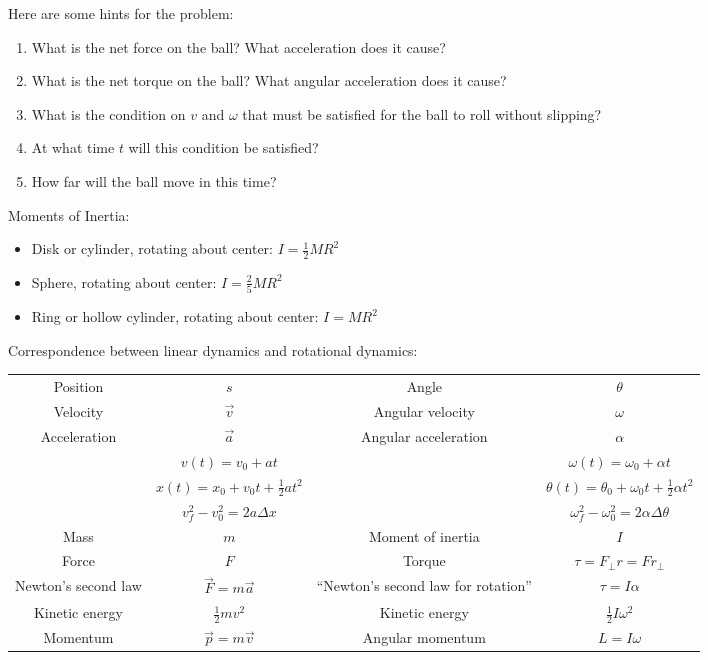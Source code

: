 \documentclass[12pt]{article}
\begin{document}
\begin{enumerate}
{     Here are some hints for the problem:
     \begin{enumerate}
       \item{What is the net force on the ball? What acceleration does it cause?}
       \item{What is the net torque on the ball? What angular acceleration does it cause?}
       \item{What is the condition on $v$ and $\omega$ that must be satisfied for the ball to roll without slipping?}
       \item{At what time $t$ will this condition be satisfied?}
       \item{How far will the ball move in this time?}
     \end{enumerate}

   }

\newpage

\centerline{}


Moments of Inertia:
\begin{itemize}
  \item{Disk or cylinder, rotating about center: $I = \frac{1}{2}MR^2$}
  \item{Sphere, rotating about center: $I = \frac{2}{5}MR^2$}
  \item{Ring or hollow cylinder, rotating about center: $I = MR^2$}
\end{itemize}

\bigskip
\bigskip
\bigskip

Correspondence between linear dynamics and rotational dynamics: 
  \scriptsize

\begin{tabular}{| c | c | c | c |}
  \hline
  Position & $s$ & Angle & $\theta$  \\
  Velocity & $\vec v$ & Angular velocity & $\omega$  \\
  Acceleration & $\vec a$ & Angular acceleration & $\alpha$  \\
  \hline
                                   & $v(t) = v_0 + at$ & & $\omega(t) = \omega_0 + \alpha t$ \\
                                   & $x(t) = x_0 + v_0 t + \frac{1}{2} at^2$ & & $\theta(t) = \theta_0 + \omega_0 t + \frac{1}{2} \alpha t^2$ \\
                                   & $v_f^2 - v_0^2 = 2a \Delta x$ & & $\omega_f^2 - \omega_0^2 = 2 \alpha \Delta \theta$ \\
  \hline
  Mass & $m$ & Moment of inertia & $I$ \\
  \hline
  Force & $F$ & Torque & $\tau = F_\perp r = F r_\perp$ \\
  \hline
  Newton's second law & $\vec F = m \vec a$ & ``Newton's second law for rotation'' & $\tau = I \alpha$ \\
  \hline
  Kinetic energy & $\frac{1}{2} mv^2$ & Kinetic energy & $\frac{1}{2}I\omega^2$ \\
  \hline
  Momentum & $\vec p = m \vec v$ & Angular momentum & $L = I \omega$ \\
  \hline
\end{tabular}


\end{enumerate}
\end{document}

